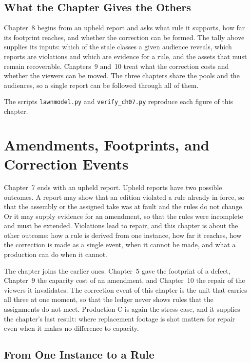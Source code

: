 \documentclass[11pt,twoside,openright]{book}
\theoremstyle{plain}
\theoremstyle{definition}
\theoremstyle{remark}
\begin{document}
\section{What the Chapter Gives the Others}\label{sec:gives7}

Chapter~8 begins from an upheld report and asks what rule it supports, how far its footprint reaches, and whether the correction can be formed. The tally above supplies its inputs: which of the stale classes a given audience reveals, which reports are violations and which are evidence for a rule, and the assets that must remain recoverable. Chapters~9 and~10 treat what the correction costs and whether the viewers can be moved. The three chapters share the pools and the audiences, so a single report can be followed through all of them.

The scripts \texttt{lawnmodel.py} and \texttt{verify\_ch07.py} reproduce each figure of this chapter.

\chapter{Amendments, Footprints, and Correction Events}
\label{ch:amend}

Chapter~7 ends with an upheld report. Upheld reports have two possible outcomes. A report may show that an edition violated a rule already in force, so that the assembly or the assigned take was at fault and the rules do not change. Or it may supply evidence for an amendment, so that the rules were incomplete and must be extended. Violations lead to repair, and this chapter is about the other outcome: how a rule is derived from one instance, how far it reaches, how the correction is made as a single event, when it cannot be made, and what a production can do when it cannot.

The chapter joins the earlier ones. Chapter~5 gave the footprint of a defect, Chapter~9 the capacity cost of an amendment, and Chapter~10 the repair of the viewers it invalidates. The correction event of this chapter is the unit that carries all three at one moment, so that the ledger never shows rules that the assignments do not meet. Production C is again the stress case, and it supplies the chapter's last result: where replacement footage is shot matters for repair even when it makes no difference to capacity.

\section{From One Instance to a Rule}\label{sec:general}
\end{document}
